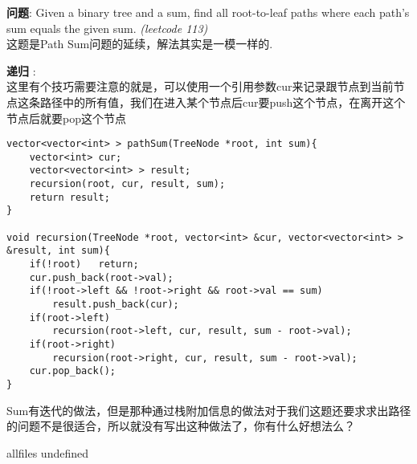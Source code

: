 \documentclass{article}
\begin{document}
\begin{CJK}{UTF8}{gbsn}     %

\else
	
\begin{description}
	\item{\textbf{问题}}: Given a binary tree and a sum, find all root-to-leaf paths where each path's sum equals the given sum. \textit{(leetcode 113)}
	\\这题是Path Sum问题的延续，解法其实是一模一样的.
	\item{\textbf{递归}} : 
	\\这里有个技巧需要注意的就是，可以使用一个引用参数cur来记录跟节点到当前节点这条路径中的所有值，我们在进入某个节点后cur要push这个节点，在离开这个节点后就要pop这个节点
	\begin{lstlisting}
vector<vector<int> > pathSum(TreeNode *root, int sum){
	vector<int> cur;
	vector<vector<int> > result;
	recursion(root, cur, result, sum);
	return result;
}

void recursion(TreeNode *root, vector<int> &cur, vector<vector<int> > &result, int sum){
	if(!root)	return;
	cur.push_back(root->val);
	if(!root->left && !root->right && root->val == sum)
		result.push_back(cur);
	if(root->left)
		recursion(root->left, cur, result, sum - root->val);
	if(root->right)
		recursion(root->right, cur, result, sum - root->val);
	cur.pop_back();
}
	\end{lstlisting}
	 Sum有迭代的做法，但是那种通过栈附加信息的做法对于我们这题还要求求出路径的问题不是很适合，所以就没有写出这种做法了，你有什么好想法么？
\end{description}

\fi

\ifx allfiles undefined
\end{CJK}
\end{document}
